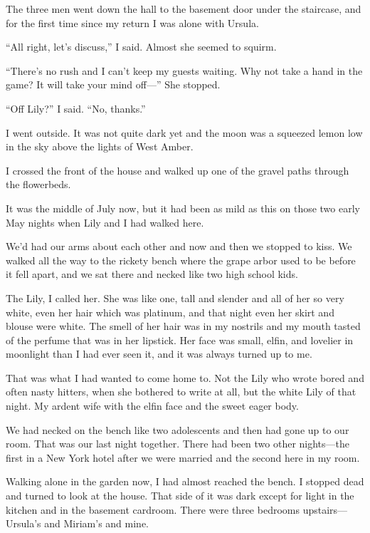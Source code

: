 \documentclass{novel}
\begin{document}
The three men went down the hall to the basement door under the staircase, and for the first time since my return I was alone with Ursula.

“All right, let’s discuss,” I said. Almost she seemed to squirm.

“There’s no rush and I can’t keep my guests waiting. Why not take a hand in the game? It will take your mind off—” She stopped.

“Off Lily?” I said. “No, thanks.”

\scenestars

I went outside. It was not quite dark yet and the moon was a squeezed lemon low in the sky above the lights of West Amber. 

I crossed the front of the house and walked up one of the gravel paths through the flowerbeds.

It was the middle of July now, but it had been as mild as this on those two early May nights when Lily and I had walked here. 

We’d had our arms about each other and now and then we stopped to kiss. We walked all the way to the rickety bench where the grape arbor used to be before it fell apart, and we sat there and necked like two high school kids.

The Lily, I called her. She was like one, tall and slender and all of her so very white, even her hair which was platinum, and that night even her skirt and blouse were white. The smell of her hair was in my nostrils and my mouth tasted of the perfume that was in her lipstick. Her face was small, elfin, and lovelier in moonlight than I had ever seen it, and it was always turned up to me.

That was what I had wanted to come home to. Not the Lily who wrote bored and often nasty hitters, when she bothered to write at all, but the white Lily of that night. My ardent wife with the elfin face and the sweet eager body.

We had necked on the bench like two adolescents and then had gone up to our room. That was our last night together. There had been two other nights—the first in a New York hotel after we were married and the second here in my room.

Walking alone in the garden now, I had almost reached the bench. I stopped dead and turned to look at the house. That side of it was dark except for light in the kitchen and in the basement cardroom. There were three bedrooms upstairs—Ursula’s and Miriam’s and mine. 
\end{document}
